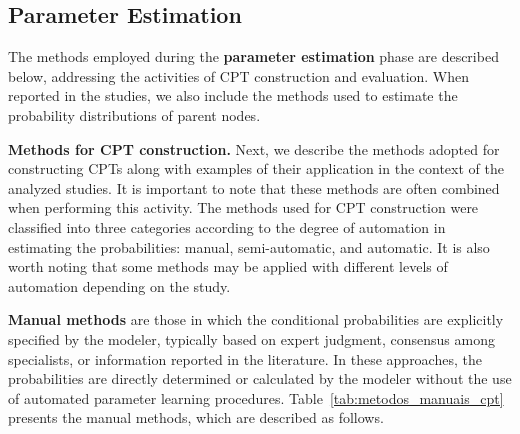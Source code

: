 \subsection{Parameter Estimation}

The methods employed during the \textbf{parameter estimation} phase are described below, addressing the activities of CPT construction and evaluation. When reported in the studies, we also include the methods used to estimate the probability distributions of parent nodes.  

\vspace*{0.5\baselineskip}

\textbf{Methods for CPT construction.} Next, we describe the methods adopted for constructing CPTs along with examples of their application in the context of the analyzed studies. It is important to note that these methods are often combined when performing this activity. The methods used for CPT construction were classified into three categories according to the degree of automation in estimating the probabilities: manual, semi-automatic, and automatic. It is also worth noting that some methods may be applied with different levels of automation depending on the study.

\textbf{Manual methods} are those in which the conditional probabilities are explicitly specified by the modeler, typically based on expert judgment, consensus among specialists, or information reported in the literature. In these approaches, the probabilities are directly determined or calculated by the modeler without the use of automated parameter learning procedures. Table~\ref{tab:metodos_manuais_cpt} presents the manual methods, which are described as follows.


